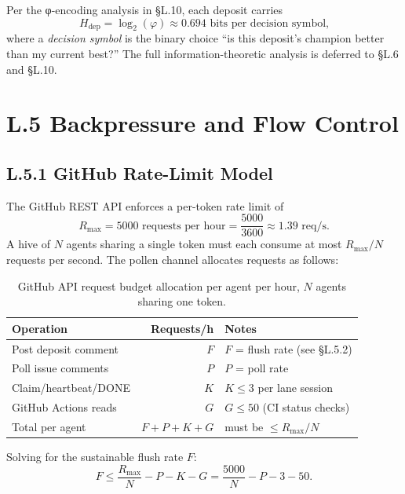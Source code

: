Per the φ-encoding analysis in §L.10, each deposit carries
\[
  H_{\text{dep}} = \log_{2}(\varphi) \approx 0.694 \text{ bits per decision symbol,}
\]
where a \emph{decision symbol} is the binary choice
``is this deposit's champion better than my current best?''  The
full information-theoretic analysis is deferred to §L.6 and §L.10.

\section*{L.5 \quad Backpressure and Flow Control}
\label{sec:appl-backpressure}

\subsection*{L.5.1 \quad GitHub Rate-Limit Model}

The GitHub REST API enforces a per-token rate limit of
\[
  R_{\max} = 5000 \text{ requests per hour} = \frac{5000}{3600} \approx 1.39 \text{ req/s}.
\]
A hive of $N$ agents sharing a single token must each consume at most
$R_{\max}/N$ requests per second.  The pollen channel allocates
requests as follows:

\begin{table}[H]
\centering
\caption{GitHub API request budget allocation per agent per hour,
         $N$ agents sharing one token.}
\label{tab:budget}
\begin{tabular}{lrl}
\hline
\textbf{Operation} & \textbf{Requests/h} & \textbf{Notes} \\
\hline
Post deposit comment  & $F$ & $F$ = flush rate (see §L.5.2) \\
Poll issue comments   & $P$ & $P$ = poll rate \\
Claim/heartbeat/DONE  & $K$ & $K \leq 3$ per lane session \\
GitHub Actions reads  & $G$ & $G \leq 50$ (CI status checks) \\
\hline
Total per agent       & $F + P + K + G$ & must be $\leq R_{\max}/N$ \\
\hline
\end{tabular}
\end{table}

\noindent Solving for the sustainable flush rate $F$:
\begin{equation}
  F \leq \frac{R_{\max}}{N} - P - K - G
    = \frac{5000}{N} - P - 3 - 50.
  \label{eq:flush-budget}
\end{equation}

